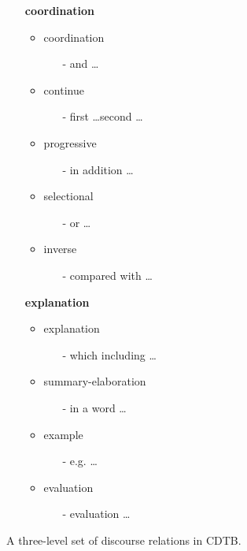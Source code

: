 \begin{figure}[!htbp]
\begin{multicols}{2}
\begin{itemize}
  \vfill
  \columnbreak

  \item[] \textbf{coordination}
  \begin{itemize}
    \item coordination
    \begin{itemize}
      \item[-] and \ldots
    \end{itemize}
    \item continue
    \begin{itemize}
      \item[-] first \ldots second \ldots
    \end{itemize}
    \item progressive
    \begin{itemize}
      \item[-] in addition \ldots
    \end{itemize}
    \item selectional
    \begin{itemize}
      \item[-] or \ldots
    \end{itemize}
    \item inverse
    \begin{itemize}
      \item[-] compared with \ldots
    \end{itemize}
  \end{itemize}

  \item[] \textbf{explanation}
  \begin{itemize}
    \item explanation
    \begin{itemize}
      \item[-] which including \ldots
    \end{itemize}
    \item summary-elaboration
    \begin{itemize}
      \item[-] in a word \ldots
    \end{itemize}
    \item example
    \begin{itemize}
      \item[-] e.g. \ldots
    \end{itemize}
    \item evaluation
    \begin{itemize}
      \item[-] evaluation \ldots
    \end{itemize}
  \end{itemize}
\end{itemize}
\end{multicols}

\caption{\label{i:three-level} A three-level set of discourse relations in
CDTB. }
\end{figure}
